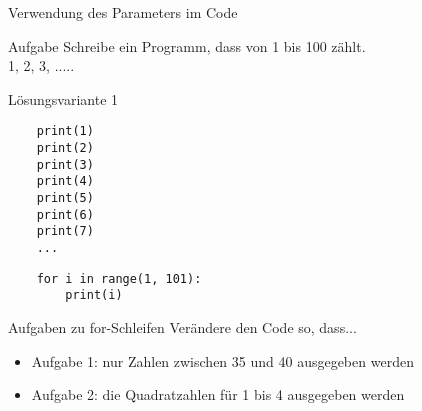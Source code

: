 \begin{frame}[fragile]{Verwendung des Parameters im Code}
\begin{block}{Aufgabe}
    Schreibe ein Programm, dass von 1 bis 100 zählt.\\
   1, 2, 3, .....
\end{block}
\begin{exampleblock}{Lösungsvariante 1}
    \begin{lstlisting}
	print(1)
	print(2)
	print(3)
	print(4)
	print(5)
	print(6)
	print(7)
	...
    \end{lstlisting}
    \pause{}
    \begin{lstlisting}
    for i in range(1, 101):
    	print(i)
    \end{lstlisting}
\end{exampleblock}
\end{frame}

\begin{frame}[fragile]{Aufgaben zu for-Schleifen}
Verändere den Code so, dass...
\begin{itemize}
	\item Aufgabe 1: nur Zahlen zwischen 35 und 40 ausgegeben werden
	\item Aufgabe 2: die Quadratzahlen für 1 bis 4 ausgegeben werden 
\end{itemize}
\end{frame}




